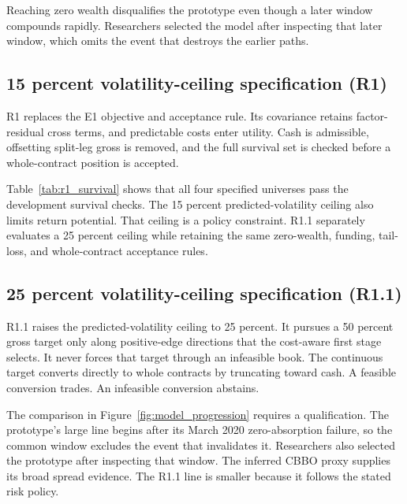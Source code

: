 Reaching zero wealth disqualifies the prototype even though a later window compounds
rapidly. Researchers selected the model after inspecting that later window, which omits
the event that destroys the earlier paths.

\FloatBarrier
\subsection{15 percent volatility-ceiling specification (R1)}

R1 replaces the E1 objective and acceptance rule. Its covariance
retains factor-residual cross terms, and predictable costs enter utility. Cash is
admissible, offsetting split-leg gross is removed, and the full survival set is checked
before a whole-contract position is accepted.

\begin{table}[!ht]
\centering
\caption{R1 monthly walk-forward development summary for 60 observed returns from January
2021 through April 2026. Terminal wealth and tail statistics describe whole-contract
books under the 15 percent volatility ceiling.}
\label{tab:r1_survival}
\resizebox{\textwidth}{!}{}
\end{table}

Table~\ref{tab:r1_survival} shows that all four specified universes pass the development
survival checks. The 15 percent predicted-volatility ceiling also limits return potential.
That ceiling is a policy constraint. R1.1 separately evaluates a 25 percent ceiling while
retaining the same zero-wealth, funding, tail-loss, and whole-contract acceptance rules.

\FloatBarrier
\subsection{25 percent volatility-ceiling specification (R1.1)}

R1.1 raises the predicted-volatility ceiling to 25 percent. It
pursues a 50 percent gross target only along positive-edge directions that the cost-aware
first stage selects. It never forces that target through an infeasible book. The
continuous target converts directly to whole contracts by truncating toward cash. A
feasible conversion trades. An infeasible conversion abstains.

The comparison in Figure~\ref{fig:model_progression} requires a qualification. The
prototype's large line begins after its March 2020 zero-absorption failure,
so the common window excludes the event that invalidates it. Researchers also selected
the prototype after inspecting that window. The inferred CBBO proxy supplies its broad
spread evidence. The R1.1 line is smaller because it follows the stated risk policy.

